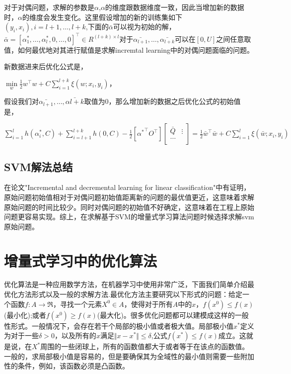 \documentclass[master]{njuthesis}
\begin{document}
    对于对偶问题，求解的参数是$\alpha$,$\alpha$的维度跟数据维度一致，因此当增加新的数据时，$\alpha$的维度会发生变化。这里假设增加的新的训练集如下$(y_i,x_i),i = l+1,\dots,l+k$,下面的$\bar{\alpha}$可以视为初始的解，$\bar{\alpha} = [\alpha^\ast_1,\dots,\alpha^\ast_l,0,\dots,0]^\intercal \in R^{\left(l+k\right) \times l}$对于$\bar{\alpha_{l+1}},\dots,\bar{\alpha_{l+k}}$可以在$[0,U]$之间任意取值，如何最优地对其进行赋值是求解incremtal learning中的对偶问题面临的问题。

    新数据进来后优化公式是，
    
    $\min\limits_{w} \frac{1}{2}w^\intercal w+C\sum_{i=1}^{l+k} \xi\left(w;x_i,y_i\right)$，

    假设我们对$\bar{\alpha_{l+1}},\dots,\bar{\alpha{l+k}}$取值为0，那么增加新的数据之后优化公式的初始值是，
    
    $\sum_{i=1}^l h\left(\alpha^\ast_i,C\right)+\sum_{i=l+1}^{l+k} h\left(0,C\right)-\frac{1}{2}[{\alpha^\ast}^\intercal O^\intercal]\left[{\begin{array}{ccccc} \bar{Q} & \vdots \\ \dots & \\ \end{array}}\right] = \frac{1}{2}\bar{w}^\intercal \bar{w}+C\sum_{i=1}^l \xi\left(\bar{w};x_i,y_i\right)$
    
\subsection{SVM解法总结}

    在论文"Incremental and decremental learning for linear classification"中有证明，原始问题初始值相对于对偶问题初始值距离新的问题的最优值更近，这意味着求解原始问题的时间比较少。同时对偶问题的初始值不好确定，这意味着在工程上原始问题更容易实现。综上，在求解基于SVM的增量式学习算法问题时候选择求解svm原始问题。

\section{增量式学习中的优化算法}

优化算法是一种应用数学方法，在机器学习中使用非常广泛，下面我们简单介绍最优化方法形式以及一般的求解方法.最优化方法主要研究以下形式的问题：给定一个函数$f:A\rightarrow\Re$，寻找一个元素$X^0 \in A$，使得对于所有$A$中的$x$，$f\left(x^0\right) \le f\left(x\right)$(最小化);或者$f\left(x^0\right) \ge f\left(x\right)$(最大化)。很多优化问题都可以建模成这样的一般性形式。一般情况下，会存在若干个局部的极小值或者极大值。局部极小值$x^\ast$定义为对于一些$\delta>0$，以及所有的$x$满足$\Vert x-x^\ast\Vert \le \delta$,公式$f\left(x^\ast \right) \le f\left(x\right)$成立。这就是说，在$X^\ast$周围的一些闭球上，所有的函数值都大于或者等于在该点的函数值。一般的，求局部极小值是容易的，但是要确保其为全域性的最小值则需要一些附加性的条件，例如，该函数必须是凸函数。
    
\end{document}
